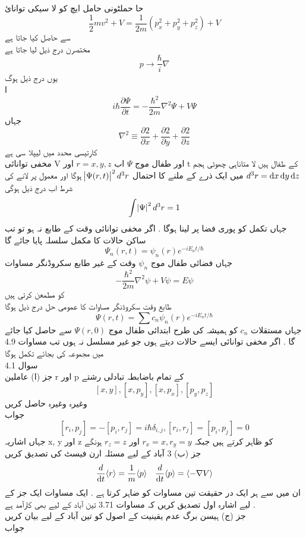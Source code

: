 \documentclass{book}
\begin{document}
حا
حملٹونی حامل ایچ کو لا سیکی توانائ
\[\frac{1}{2}mv^{2}+V=\frac{1}{2m}(p_{x}^{2}+p_{y}^{2}+p_{z}^{2})+V\]
سے حاصل کیا جاتا ہے\\
مختصرن درج ذیل لیا جاتا ہے
\[p\rightarrow \frac{\hbar}{i}\nabla\]
یوں درج ذیل ہوگ\\ا
\[i\hbar\frac{\partial{\Psi}}{\partial{t}}=-\frac{\hbar^{2}}{2m}\nabla^{2}\Psi+V\Psi\]
جہاں
\[\nabla^{2}\equiv \frac{\partial{2}}{\partial{x}}+\frac{\partial{2}}{\partial{y}}+\frac{\partial{2}}{\partial{z}}\]
کارتیسی محدد میں لیپلا سی ہے\\
مخفی توانائی
 V
  اور طفال موج 
 \(\Psi\)
   اب
\(r=x,y,z\)
اور t کے طفال ہیں 
لا متاناہی چھوٹی ہجم 
\(d^{3}r=\dif{x}\dif{y}\dif{z}\)
میں ایک ذرے کے ملنے کا احتمال
 \(\abs{\Psi(r,t)}^{2}d^{3}r\)
  ہوگا اور معمول پر لانے کی شرط اب درج ذیل ہوگی \\
\[\int\abs{\Psi}^{2}d^{3}r=1\]
جہاں تکمل کو پوری فضا پر لینا ہوگا .
اگر مخفی توانائی وقت کے طابع نہ ہو تو تب ساکن حالات کا مکمل سلسلہ پایا جائے گا \\
\[\Psi_{n}(r,t)=\psi_{n}(r)e^{-iE_{n}t/\hbar}\]
جہاں فضائی طفال موج 
\(\psi_{n}\)
 وقت کے غیر طابع سکروڈنگر مساوات 
\[\boxed{-\frac{\hbar^{2}}{2m}\nabla^{2}\psi+V\psi=E\psi}\]
کو مطمعن کرتی ہیں \\
طابع وقت سکروڈنگر مساوات کا عمومی حل درج ذیل ہوگا
\[\Psi(r,t)=\sum c_{n}\psi_{n}(r)e^{-iE_{n}t/\hbar}\]
جہاں مستقلات 
\(c_{n}\)
 کو ہمیشہ کی طرح ابتدائی طفال موج 
 \(\Psi(r,0)\)
  سے حاصل کیا جائے گا .
اگر مخفی توانائی ایسے حالات دیتے ہوں جو غیر مسلسل نہ ہوں تب مساوات 4.9 میں مجموعہ کی بجائے تکمل ہوگا\\
سوال 
4.1\\
جز (ا) عاملین r اور p کے تمام باضابطہ تبادلی رشتے
\[[x,y],[x,p_{y}],[x,p_{x}],[p_{y},p_{z}]\]
وغیرہ وغیرہ حاصل کریں\\
جواب
 \[[r_{i},p_{j}]=-[p_{i},r_{j}]=i\hbar\delta_{i,j},[r_{i},r_{j}]=[p_{i},p_{j}]=0\]
جہاں اشاریہ x, y اور z کو ظاہر کرتے ہیں 
جبکہ 
\(r_{x}=x,r_{y}=y\)
اور 
\(r_{z}=z\)
ہونگے\\
جز (ب) 3 آباد کے لیے مسئلہ ارن فیسٹ کی تصدیق کریں \\
\[\frac{d}{\dif{t}}\langle r\rangle =\frac{1}{m}\langle p\rangle \quad \frac{d}{\dif{t}}\langle p\rangle=\langle -\nabla V\rangle\]
ان میں سے ہر ایک در حقیقت تین مساوات کو ضاہر کرتا ہے .
ایک مساوات ایک جز کے لیے اشارہ 
اول تصدیق کریں کہ مساوات 3.71 تین آباد کے لیے بھی کارآمد ہے .\\
جز (ج) ہیسن برگ عدم یقینیت کے اصول کو تین آباد کے لیے بیان کریں \\
جواب\\
\end{document}

